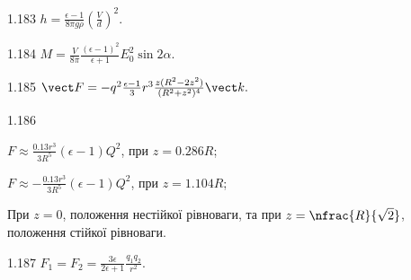 \begin{Solution}{1.{183}}
	$h = \frac{\epsilon - 1}{8\pi g \rho} \left(\frac{V}{d} \right)^2$.
\end{Solution}
\begin{Solution}{1.{184}}
	$M = \frac{V}{8\pi} \frac{(\epsilon - 1)^2}{\epsilon + 1} E_0^2\sin2\alpha$.
\end{Solution}
\begin{Solution}{1.{185}}
	$\vect F = - q^2\frac{\epsilon - 1}{3}r^3 \frac{z(R^2 - 2z^2)}{(R^2 + z^2)^4} \vect k.$
\end{Solution}
\begin{Solution}{1.{186}}
	\begin{enumerate*}[label=\alph*)]
		\item $F \approx \frac{0.13r^3}{3R^5} (\epsilon - 1) Q^2$, при $z = 0.286 R$;
		\item $F \approx - \frac{0.13r^3}{3R^5} (\epsilon - 1) Q^2$, при $z = 1.104 R$;
		\item При $z = 0$, положення нестійкої рівноваги, та при $z = \nfrac{R}{\sqrt2}$, положення стійкої рівноваги.
	\end{enumerate*}
\end{Solution}
\begin{Solution}{1.{187}}
	$F_1 = F_2 = \frac{3\epsilon}{2\epsilon + 1}\frac{q_1q_2}{r^2}$.
\end{Solution}
